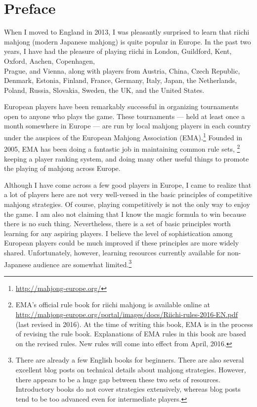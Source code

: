 \chapter{Preface}
\thispagestyle{empty}

When I moved to England in 2013, I was pleasantly surprised to learn that riichi mahjong (modern Japanese mahjong) is quite popular in Europe. In the past two years, I have had the pleasure of playing riichi in London, Guildford, Kent, Oxford, Aachen, Copenhagen,\\ Prague, and Vienna, along with players from Austria, China, Czech Republic, Denmark, Estonia, Finland, France, Germany, Italy, Japan, the Netherlands, Poland, Russia, Slovakia, Sweden, the UK, and the United States. 

\bigskip
European players have been remarkably successful in organizing tournaments open to anyone who plays the game. These tournaments --- held at least once a month somewhere in Europe --- are run by local mahjong players in each country under the auspices of the European Mahjong Association (EMA).\footnote{\url{http://mahjong-europe.org/}} 
Founded in 2005, EMA has been doing a fantastic job in maintaining common rule sets,%
\footnote{EMA's official rule book for riichi mahjong is available online at \url{http://mahjong-europe.org/portal/images/docs/Riichi-rules-2016-EN.pdf} (last revised in 2016). At the time of writing this book, EMA is in the process of revising the rule book. 
Explanations of EMA rules in this book are based on the revised rules. New rules will come into effect from April, 2016.
}
keeping a player ranking system, and doing many other useful things to promote the playing of mahjong across Europe. 

\bigskip
Although I have come across a few good players in Europe, I came to realize that a lot of players here are not very well-versed in the basic principles of competitive mahjong strategies. Of course, playing competitively is not the only way to enjoy the game.
I am also not claiming that I know the magic formula to win because there is no such thing. Nevertheless, there is a set of basic principles worth learning for any aspiring players. I believe the level of sophistication among European players could be much improved if these principles are more widely shared. Unfortunately, however, learning resources currently available for non-Japanese audience are somewhat limited.\footnote{There are already a few English books for beginners. There are also several excellent blog posts on technical details about mahjong strategies. However, there appears to be a huge gap between these two sets of resources. Introductory books do not cover strategies extensively, whereas blog posts tend to be too advanced even for intermediate players.}

